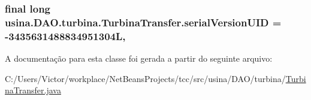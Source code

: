 \hypertarget{classusina_1_1_d_a_o_1_1turbina_1_1_turbina_transfer_af045072d2dcbfdf01eef572cf62ba9e3}{
\subsubsection[{serial\-Version\-U\-I\-D}]{\setlength{\rightskip}{0pt plus 5cm}final long usina.\-D\-A\-O.\-turbina.\-Turbina\-Transfer.\-serial\-Version\-U\-I\-D = -\/3435631488834951304\-L\hspace{0.3cm}{\ttfamily [static]}, {\ttfamily [private]}}}\label{classusina_1_1_d_a_o_1_1turbina_1_1_turbina_transfer_af045072d2dcbfdf01eef572cf62ba9e3}


A documentação para esta classe foi gerada a partir do seguinte arquivo\-:\begin{DoxyCompactItemize}
\item 
C\-:/\-Users/\-Victor/workplace/\-Net\-Beans\-Projects/tcc/src/usina/\-D\-A\-O/turbina/\hyperlink{_turbina_transfer_8java}{Turbina\-Transfer.\-java}\end{DoxyCompactItemize}
